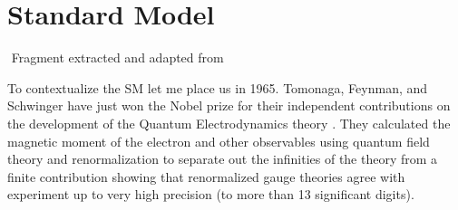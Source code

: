 
\section{Standard Model}

{$ $ \scriptsize \hfill Fragment extracted and adapted from \cite{robinson2011symmetry}}

To contextualize the SM let me place us in 1965. Tomonaga, Feynman, and Schwinger have just won the Nobel prize for their independent contributions on the development of the Quantum Electrodynamics theory \cite{1972physics}. They calculated the magnetic moment of the electron and other observables using quantum field theory and renormalization to separate out the infinities of the theory from a finite contribution \cite{PhysRev.75.486} showing that renormalized gauge theories agree with experiment up to very high precision (to more than 13 significant digits)\cite{1674-1137-40-10-100001}.

